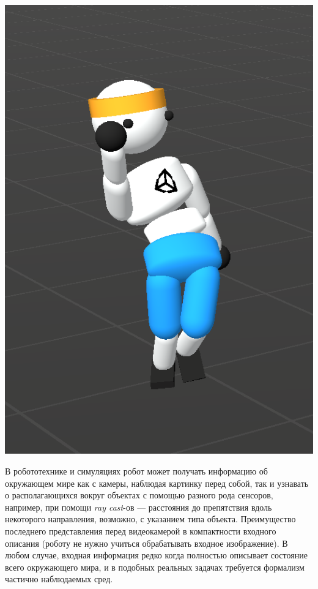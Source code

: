 \begin{exampleBox}[righthand ratio=0.25, sidebyside, sidebyside align=center, lower separated=false]{}
\tcblower
\includegraphics[width=\textwidth]{Images/Dancer.png}
\end{exampleBox}

\begin{example}
В робототехнике и симуляциях робот может получать информацию об окружающем мире как с камеры, наблюдая картинку перед собой, так и узнавать о располагающихся вокруг объектах с помощью разного рода сенсоров, например, при помощи \emph{ray cast}-ов --- расстояния до препятствия вдоль некоторого направления, возможно, с указанием типа объекта. Преимущество последнего представления перед видеокамерой в компактности входного описания (роботу не нужно учиться обрабатывать входное изображение). В любом случае, входная информация редко когда полностью описывает состояние всего окружающего мира, и в подобных реальных задачах требуется формализм частично наблюдаемых сред. 
\end{example}